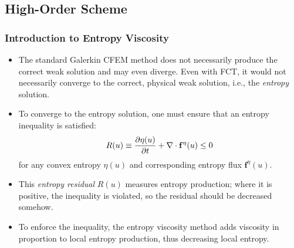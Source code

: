 \subsection{High-Order Scheme}
\begin{frame}
\frametitle{Introduction to Entropy Viscosity}

\begin{itemize}
   \item The standard Galerkin CFEM method does not necessarily produce the
      correct weak solution and may even diverge. Even with
      FCT, it would not necessarily converge to the correct, physical
      weak solution, i.e., the \emph{entropy} solution.
   \item To converge to the entropy solution, one must ensure that an entropy
      inequality is satisfied:
      \begin{equation}
         R(u) \equiv \frac{\partial \eta(u)}{\partial t} + \nabla\cdot\mathbf{f}^\eta(u) \leq 0
      \end{equation}
      for any convex entropy $\eta(u)$ and corresponding entropy flux
      $\mathbf{f}^\eta(u)$.
   \item This \emph{entropy residual} $R(u)$ measures entropy production;
      where it is positive, the inequality is violated, so the residual
      should be decreased somehow.
   \item To enforce the inequality, the entropy viscosity method adds
      viscosity in proportion to local entropy production, thus decreasing
      local entropy.
\end{itemize}

\end{frame}
